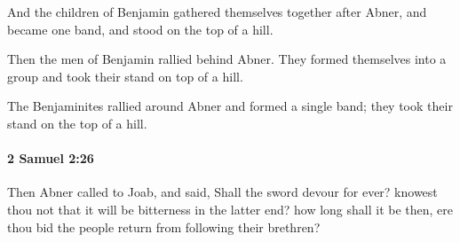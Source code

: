 			\begin{versebox}
					\item[BHS] 
					\item[ASV] And the children of Benjamin gathered themselves together after Abner, and became one band, and stood on the top of a hill.
					\item[NIV] Then the men of Benjamin rallied behind Abner. They formed themselves into a group and took their stand on top of a hill.
					\item[NRSV] The Benjaminites rallied around Abner and formed a single band; they took their stand on the top of a hill.
			\end{versebox}

		\paragraph{2 Samuel 2:26} %
			\label{2SAMUEL-2-26}

			Then Abner called to Joab, and said, Shall the sword devour for ever? knowest thou not that it will be bitterness in the latter end? how long shall it be then, ere thou bid the people return from following their brethren?

